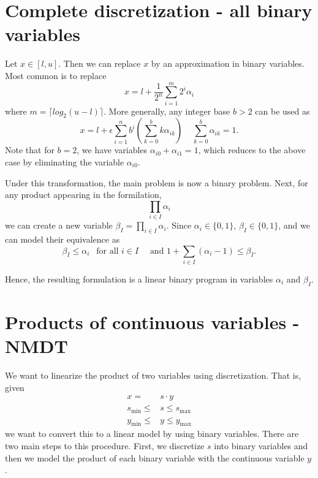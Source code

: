 \section{Complete discretization - all binary variables}
Let $x \in [l,u]$.  Then we can replace $x$ by an approximation in binary variables.  Most common is to replace
\begin{equation}
x = l +  \frac{1}{2^n} \sum_{i=1}^m 2^i \alpha_{i}
\end{equation}
where $m = \lceil log_2(u-l) \rceil$.  More generally, any integer base $b > 2$ can be used as 
\begin{equation}
x = l + \epsilon \sum_{i=1}^n b^i \left(\sum_{k=0}^b k \alpha_{ik}\right) \ \ \ \ \ \sum_{k=0}^b \alpha_{ik} = 1.
\end{equation}
Note that for $b=2$, we have variables $\alpha_{i0} + \alpha_{i1} = 1$, which reduces to the above case by eliminating the variable $\alpha_{i0}$.


Under this transformation, the main problem is now a binary problem.  Next, for any product appearing in the formilation,
$$
\prod_{i \in I} \alpha_i
$$
we can create a new variable $\beta_I = \prod_{i \in I} \alpha_i$.  Since $\alpha_i \in \{0,1\}$, $\beta_I \in \{0,1\}$, and we can model their equivalence as
\begin{equation}
\beta_I \leq \alpha_i  \ \ \text{ for all } i \in I \quad \text{ and } 1 + \sum_{i \in I} (\alpha_i-1) \leq \beta_I.
\end{equation}

Hence, the resulting formulation is a linear binary program in variables $\alpha_i$ and $\beta_I$.



\section{Products of continuous variables - NMDT}
We want to linearize the product of two variables using discretization.  That is, given 
\begin{equation}
\begin{split}
x =& s \cdot y\\
s_{\min} \leq &s \leq s_{\max}\\
y_{\min} \leq &y \leq y_{\max}
\end{split}
\end{equation}
we want to convert this to a linear model by using binary variables.  There are two main steps to this procedure.  First, we discretize $s$ into binary variables and then we model the product of each binary variable with the continuous variable $y$.
